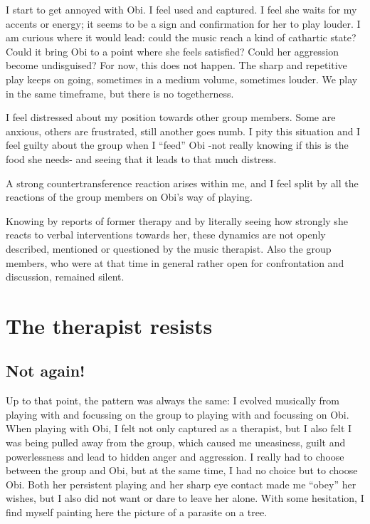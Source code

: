 \documentclass[authordate, empirical, issue]{jote-new-article}
\begin{document}
I start to get annoyed with Obi. I feel used and captured. I feel she waits for my accents or energy; it seems to be a sign and confirmation for her to play louder. I am curious where it would lead: could the music reach a kind of cathartic state? Could it bring Obi to a point where she feels satisfied? Could her aggression become undisguised? For now, this does not happen. The sharp and repetitive play keeps on going, sometimes in a medium volume, sometimes louder. We play in the same timeframe, but there is no togetherness.



I feel distressed about my position towards other group members. Some are anxious, others are frustrated, still another goes numb. I pity this situation and I feel guilty about the group when I “feed” Obi -not really knowing if this is the food she needs- and seeing that it leads to that much distress.



A strong countertransference reaction arises within me, and I feel split by all the reactions of the group members on Obi's way of playing.



Knowing by reports of former therapy and by literally seeing how strongly she reacts to verbal interventions towards her, these dynamics are not openly described, mentioned or questioned by the music therapist. Also the group members, who were at that time in general rather open for confrontation and discussion, remained silent.


\section{The therapist resists}



\subsection{Not again!}



Up to that point, the pattern was always the same: I evolved musically from playing with and focussing on the group to playing with and focussing on Obi. When playing with Obi, I felt not only captured as a therapist, but I also felt I was being pulled away from the group, which caused me uneasiness, guilt and powerlessness and lead to hidden anger and aggression. I really had to choose between the group and Obi, but at the same time, I had no choice but to choose Obi. Both her persistent playing and her sharp eye contact made me “obey” her wishes, but I also did not want or dare to leave her alone. With some hesitation, I find myself painting here the picture of a parasite on a tree.
\end{document}
